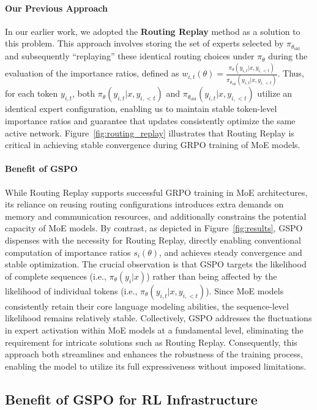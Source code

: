 \paragraph{Our Previous Approach} In our earlier work, we adopted the \textbf{Routing Replay} method as a solution to this problem. This approach involves storing the set of experts selected by $\pi_{\theta_\text{old}}$ and subsequently ``replaying'' these identical routing choices under $\pi_{\theta}$ during the evaluation of the importance ratios, defined as $w_{i,t}(\theta) = \frac{ \pi_{\theta} (y_{i,t} | x, y_{i,<t}) }{ \pi_{\theta_\text{old}} (y_{i,t} | x,y_{i,<t})}$. Thus, for each token $y_{i,t}$, both $\pi_{\theta} (y_{i,t} | x, y_{i,<t})$ and $\pi_{\theta_\text{old}} (y_{i,t} | x,y_{i,<t})$ utilize an identical expert configuration, enabling us to maintain stable token-level importance ratios and guarantee that updates consistently optimize the same active network. Figure~\ref{fig:routing_replay} illustrates that Routing Replay is critical in achieving stable convergence during GRPO training of MoE models.

\paragraph{Benefit of GSPO} While Routing Replay supports successful GRPO training in MoE architectures, its reliance on reusing routing configurations introduces extra demands on memory and communication resources, and additionally constrains the potential capacity of MoE models. By contrast, as depicted in Figure~\ref{fig:results}, GSPO dispenses with the necessity for Routing Replay, directly enabling conventional computation of importance ratios $s_i(\theta)$, and achieves steady convergence and stable optimization. The crucial observation is that GSPO targets the likelihood of complete sequences (i.e., $\pi_{\theta} (y_i | x)$) rather than being affected by the likelihood of individual tokens (i.e., $\pi_{\theta} (y_{i,t} | x, y_{i,<t})$). Since MoE models consistently retain their core language modeling abilities, the sequence-level likelihood remains relatively stable. Collectively, GSPO addresses the fluctuations in expert activation within MoE models at a fundamental level, eliminating the requirement for intricate solutions such as Routing Replay. Consequently, this approach both streamlines and enhances the robustness of the training process, enabling the model to utilize its full expressiveness without imposed limitations.

\subsection{Benefit of GSPO for RL Infrastructure}

